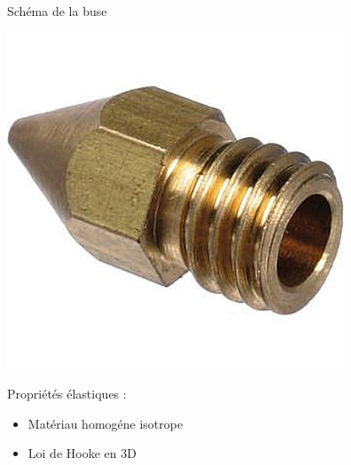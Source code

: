 \documentclass[french]{beamer}
\begin{document}
\begin{frame}{Schéma de la buse}
  \begin{minipage}{0.48\textwidth}
    \includegraphics[scale=0.3]{images/buse.png}
  \end{minipage}
  \begin{minipage}{0.48\textwidth}
    Propriétés élastiques :
    \begin{itemize}
      \item Matériau homogéne isotrope
	\pause
      \item Loi de Hooke en 3D  
    \end{itemize}
  \end{minipage}
\end{frame}
\end{document}
